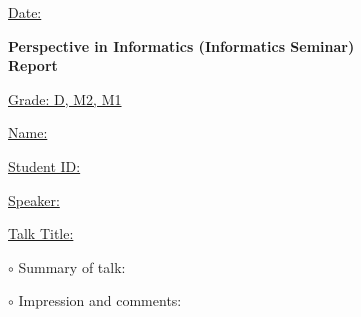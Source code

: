 \documentclass[12pt]{article}
\begin{document}
\hspace{100mm}
\underline{\large Date: \hspace{40mm}}

\vspace{2mm}

\begin{center}
{\Large \bf Perspective in Informatics (Informatics Seminar) \\ Report}
\end{center}

\vspace{2mm}

\hspace{90mm}
\underline{\large Grade: D, M2, M1 \hspace{25mm}}

\vspace{2mm}

\hspace{90mm}
\underline{\large Name: \hspace{51mm}}

\vspace{2mm}

\hspace{90mm}
\underline{\large Student ID: \hspace{40mm}}

\vspace{2mm}

\underline{\large Speaker: \hspace{60mm}}

\vspace{2mm}

\underline{\large Talk Title: \hspace{120mm}}

\vspace{2mm}

\hspace{24mm} \underline{\hspace{120mm}}

\vspace{10mm}

{\large $\circ$ Summary of talk:}

\newpage

\vspace{30mm}


{\large $\circ$ Impression and comments:}
\end{document}
